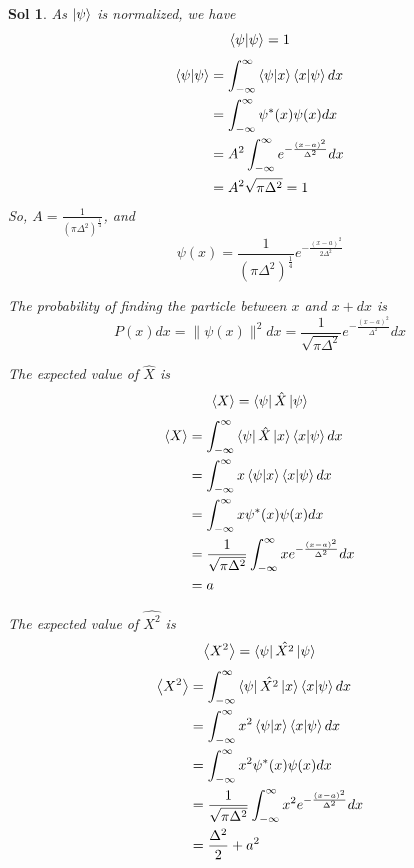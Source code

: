 \documentclass[12pt,a4paper]{report}
\newcommand{\expected}[1]{\left \langle #1 \right \rangle}
\newtheorem*{solution}{Sol}
\begin{document}
\begin{solution}
    As $\ket{\psi}$ is normalized, we have
    \begin{equation*}
        \bra{\psi}\ket{\psi} = 1
    \end{equation*}
    \begin{align*}
        \bra{\psi}\ket{\psi} &= \int_{-\infty}^{\infty} \bra{\psi}\ket{x}\bra{x}\ket{\psi} dx \\
        &= \int_{-\infty}^{\infty} \psi^*(x)\psi(x) dx \\
        &= A^2\int_{-\infty}^{\infty} e^{-\frac{(x-a)^2}{\Delta^2}} dx \\
        &= A^2 \sqrt{\pi \Delta^2} = 1
    \end{align*}
    So, $A = \frac{1}{(\pi \Delta^2)^{\frac{1}{4}}}$, and
    \begin{equation*}
        \psi(x) = \frac{1}{(\pi \Delta^2)^{\frac{1}{4}}}e^{-\frac{(x-a)^2}{2\Delta^2}}
    \end{equation*}
    
    The probability of finding the particle between $x$ and $x+dx$ is
    \begin{equation*}
        P(x)dx = \| \psi(x) \|^2 dx = \frac{1}{\sqrt{\pi \Delta^2}}e^{-\frac{(x-a)^2}{\Delta^2}} dx
    \end{equation*}

    The expected value of $\hat{X}$ is
    \begin{equation*}
        \expected{X} = \bra{\psi}\hat{X}\ket{\psi}
    \end{equation*}
    \begin{align*}
        \expected{X} &= \int_{-\infty}^{\infty}\bra{\psi}\hat{X}\ket{x}\bra{x}\ket{\psi} dx \\
        &= \int_{-\infty}^{\infty}x\bra{\psi}\ket{x}\bra{x}\ket{\psi} dx \\
        &= \int_{-\infty}^{\infty}x\psi^*(x)\psi(x) dx \\
        &= \frac{1}{\sqrt{\pi \Delta^2}}\int_{-\infty}^{\infty}xe^{-\frac{(x-a)^2}{\Delta^2}} dx \\
        &= a
    \end{align*}

    The expected value of $\hat{X^2}$ is
    \begin{equation*}
        \expected{X^2} = \bra{\psi}\hat{X^2}\ket{\psi}
    \end{equation*}
    \begin{align*}
        \expected{X^2} &= \int_{-\infty}^{\infty}\bra{\psi}\hat{X^2}\ket{x}\bra{x}\ket{\psi} dx \\
        &= \int_{-\infty}^{\infty}x^2\bra{\psi}\ket{x}\bra{x}\ket{\psi} dx \\
        &= \int_{-\infty}^{\infty}x^2\psi^*(x)\psi(x) dx \\
        &= \frac{1}{\sqrt{\pi \Delta^2}}\int_{-\infty}^{\infty}x^2e^{-\frac{(x-a)^2}{\Delta^2}} dx \\
        &= \frac{\Delta^2}{2} + a^2
    \end{align*}


\end{solution}
\end{document}
